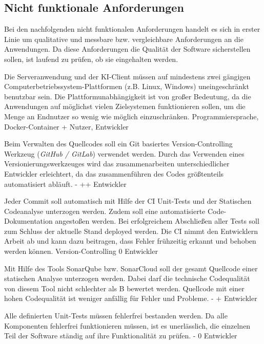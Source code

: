 \subsection{Nicht funktionale Anforderungen}

Bei den nachfolgenden nicht funktionalen Anforderungen handelt es sich in erster Linie um qualitative und messbare bzw. vergleichbare Anforderungen an die Anwendungen. Da diese Anforderungen die Qualität der Software sicherstellen sollen, ist laufend zu prüfen, ob sie eingehalten werden.

        {Die Serveranwendung und der KI-Client müssen auf mindestens zwei gängigen Computerbetriebssystem-Plattformen (z.B. Linux, Windows) uneingeschränkt benutzbar sein.}
        {Die Plattformunabhängigkeit ist von großer Bedeutung, da die Anwendungen auf möglichst vielen Zielsystemen funktionieren sollen, um die Menge an Endnutzer so wenig wie möglich einzuschränken.}
        {Programmiersprache, Docker-Container}
        {+}
        {Nutzer, Entwickler}

        {Beim Verwalten des Quellcodes soll ein Git basiertes Version-Controlling Werkzeug (\textit{GitHub / GitLab}) verwendet werden.}
        {Durch das Verwenden eines Versionierungswerkzeuges wird das zusammenarbeiten unterschiedlicher Entwickler erleichtert, da das zusammenführen des Codes größtenteils automatisiert abläuft.}
        {-}
        {++}
        {Entwickler}

        {Jeder Commit soll automatisch mit Hilfe der CI Unit-Tests und der Statischen Codeanalyse unterzogen werden. Zudem soll eine automatisierte Code-Dokumentation angestoßen werden. Bei erfolgreichem Abschließen aller Tests soll zum Schluss der aktuelle Stand deployed werden.}
        {Die CI nimmt den Entwicklern Arbeit ab und kann dazu beitragen, dass Fehler frühzeitig erkannt und behoben werden können.}
        {Version-Controlling}
        {0}
        {Entwickler}

        {Mit Hilfe des Tools \glqq{}SonarQube\grqq{} bzw. \glqq{}SonarCloud\grqq{} soll der gesamt Quellcode einer statischen Analyse unterzogen werden. Dabei darf die technische Codequalität von diesem Tool nicht schlechter als \glqq{}B\grqq{} bewertet werden.}
        {Quellcode mit einer hohen Codequalität ist weniger anfällig für Fehler und Probleme.}
        {-}
        {+}
        {Entwickler}

        {Alle definierten Unit-Tests müssen fehlerfrei bestanden werden.}
        {Da alle Komponenten fehlerfrei funktionieren müssen, ist es unerlässlich, die einzelnen Teil der Software ständig auf ihre Funktionalität zu prüfen.}
        {-}
        {0}
        {Entwickler}

